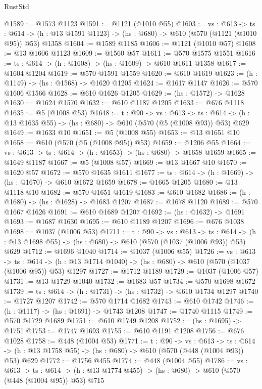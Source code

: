 \begin{lexlean}{RustStd}
\begin{coremodule}
@1589 := @1573 @1123
@1591 := @1121 (@1010 @55)
@1603 := {vs : @613} ->
  {ts : @614} -> (h : @13 @1591 @1123) -> (hs : @680) -> @610 (@570 (@1121 (@1010 @95)) @53) @1358
@1604 := @1589 @1185
@1606 := @1121 (@1010 @57)
@1608 := @13 @1606 @1123
@1609 := @1560 @57
@1611 := @570 @1575 @1551
@1616 := {ts : @614} -> (h : @1608) -> (hs : @1609) -> @610 @1611 @1358
@1617 := @1604 @1204
@1619 := @570 @1591 @1559
@1620 := @610 @1619
@1623 := (h : @1149) -> (hs : @1568) -> @1620 @1205
@1624 := @1617 @1147
@1626 := @570 @1606 @1566
@1628 := @610 @1626 @1205
@1629 := (hs : @1572) -> @1628
@1630 := @1624 @1570
@1632 := @610 @1187 @1205
@1633 := @676 @1118
@1635 := @5 (@1008 @53)
@1648 := {t : @90} ->
  {vs : @613} ->
  {ts : @614} -> (h : @13 @1635 @55) -> (hs : @680) -> @610 (@570 (@5 (@1008 @93)) @53) @629
@1649 := @1633 @10
@1651 := @5 (@1008 @55)
@1653 := @13 @1651 @10
@1658 := @610 (@570 (@5 (@1008 @95)) @53)
@1659 := @1206 @55
@1664 := {vs : @613} -> {ts : @614} -> (h : @1653) -> (hs : @680) -> @1658 @1659
@1665 := @1649 @1187
@1667 := @5 (@1008 @57)
@1669 := @13 @1667 @10
@1670 := @1620 @57
@1672 := @570 @1635 @1611
@1677 := {ts : @614} -> (h : @1669) -> (hs : @1670) -> @610 @1672 @1659
@1678 := @1665 @1205
@1680 := @13 @1118 @10
@1682 := @570 @1651 @1619
@1683 := @610 @1682
@1686 := (h : @1680) -> (hs : @1628) -> @1683 @1207
@1687 := @1678 @1120
@1689 := @570 @1667 @1626
@1691 := @610 @1689 @1207
@1692 := (hs : @1632) -> @1691
@1693 := @1687 @1630
@1695 := @610 @1189 @1207
@1696 := @676 @1038
@1698 := @1037 (@1006 @53)
@1711 := {t : @90} ->
  {vs : @613} ->
  {ts : @614} -> (h : @13 @1698 @55) -> (hs : @680) -> @610 (@570 (@1037 (@1006 @93)) @53) @629
@1712 := @1696 @1040
@1714 := @1037 (@1006 @55)
@1726 := {vs : @613} ->
  {ts : @614} -> (h : @13 @1714 @1040) -> (hs : @680) -> @610 (@570 (@1037 (@1006 @95)) @53) @1297
@1727 := @1712 @1189
@1729 := @1037 (@1006 @57)
@1731 := @13 @1729 @1040
@1732 := @1683 @57
@1734 := @570 @1698 @1672
@1739 := {ts : @614} -> (h : @1731) -> (hs : @1732) -> @610 @1734 @1297
@1740 := @1727 @1207
@1742 := @570 @1714 @1682
@1743 := @610 @1742
@1746 := (h : @1117) -> (hs : @1691) -> @1743 @1208
@1747 := @1740 @1115
@1749 := @570 @1729 @1689
@1751 := @610 @1749 @1208
@1752 := (hs : @1695) -> @1751
@1753 := @1747 @1693
@1755 := @610 @1191 @1208
@1756 := @676 @1028
@1758 := @448 (@1004 @53)
@1771 := {t : @90} ->
  {vs : @613} ->
  {ts : @614} -> (h : @13 @1758 @55) -> (hs : @680) -> @610 (@570 (@448 (@1004 @93)) @53) @629
@1772 := @1756 @455
@1774 := @448 (@1004 @55)
@1786 := {vs : @613} ->
  {ts : @614} -> (h : @13 @1774 @455) -> (hs : @680) -> @610 (@570 (@448 (@1004 @95)) @53) @715

\end{coremodule}
\end{lexlean}
